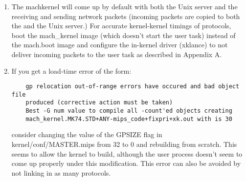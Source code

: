 \begin{enumerate}
\item The machkernel will come up by default with both the Unix server
and the \xk{} receiving and sending network packets (incoming
packets are copied to both the \xk{} and the Unix server.)  For
accurate kernel-kernel timings of \xk{} protocols, boot the
mach\_kernel image (which doesn't start the user task) instead of the
mach.boot image and configure the in-kernel driver (xklance) to not
deliver incoming packets to the user task as described in Appendix A.

\item If you get a load-time error of the form:
\begin{verbatim}
	gp relocation out-of-range errors have occured and bad object file
	produced (corrective action must be taken)
	Best -G num value to compile all -count'ed objects creating 
	mach_kernel.MK74.STD+ANY-mips_code+fixpri+xk.out with is 30
\end{verbatim}

consider changing the value of the GPSIZE flag in
kernel/conf/MASTER.mips from 32 to 0 and rebuilding from scratch.
This seems to allow the kernel to build, although the user process
doesn't seem to come up properly under this modification.  This
error can also be avoided by not linking in as many \xk{}
protocols.

\end{enumerate}
